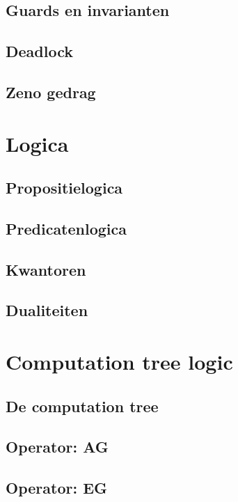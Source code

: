 \documentclass{article}
\begin{document}
\subsection{Guards en invarianten}

\subsection{Deadlock}

\subsection{Zeno gedrag}

\section{Logica}

\subsection{Propositielogica}

\subsection{Predicatenlogica}

\subsection{Kwantoren}

\subsection{Dualiteiten}

\section{Computation tree logic}

\subsection{De computation tree}

\subsection{Operator: AG}

\subsection{Operator: EG}
\end{document}

